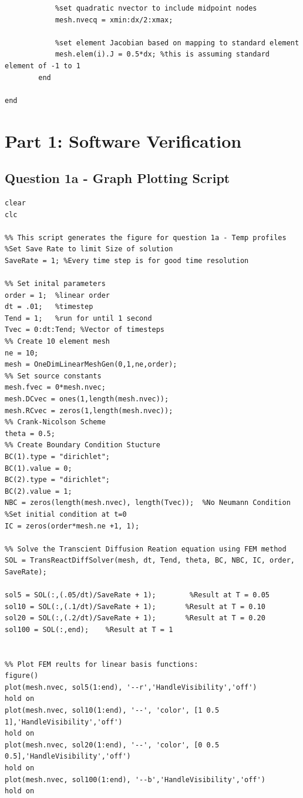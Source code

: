 \documentclass[11pt]{article}
\begin{document}
\begin{appendices}
\begin{lstlisting}
            %set quadratic nvector to include midpoint nodes
            mesh.nvecq = xmin:dx/2:xmax;
            
            %set element Jacobian based on mapping to standard element
            mesh.elem(i).J = 0.5*dx; %this is assuming standard element of -1 to 1 
        end
        
end
\end{lstlisting}


\section{Part 1: Software Verification}
\subsection{Question 1a - Graph Plotting Script}\label{ap:Q1a}

\begin{lstlisting}
clear
clc

%% This script generates the figure for question 1a - Temp profiles
%Set Save Rate to limit Size of solution
SaveRate = 1; %Every time step is for good time resolution

%% Set inital parameters
order = 1;  %linear order
dt = .01;   %timestep
Tend = 1;   %run for until 1 second
Tvec = 0:dt:Tend; %Vector of timesteps
%% Create 10 element mesh
ne = 10;
mesh = OneDimLinearMeshGen(0,1,ne,order);
%% Set source constants
mesh.fvec = 0*mesh.nvec;
mesh.DCvec = ones(1,length(mesh.nvec));
mesh.RCvec = zeros(1,length(mesh.nvec));
%% Crank-Nicolson Scheme
theta = 0.5;
%% Create Boundary Condition Stucture
BC(1).type = "dirichlet";   
BC(1).value = 0;
BC(2).type = "dirichlet";
BC(2).value = 1;
NBC = zeros(length(mesh.nvec), length(Tvec));  %No Neumann Condition
%Set initial condition at t=0
IC = zeros(order*mesh.ne +1, 1);

%% Solve the Transcient Diffusion Reation equation using FEM method
SOL = TransReactDiffSolver(mesh, dt, Tend, theta, BC, NBC, IC, order, SaveRate);

sol5 = SOL(:,(.05/dt)/SaveRate + 1);        %Result at T = 0.05
sol10 = SOL(:,(.1/dt)/SaveRate + 1);       %Result at T = 0.10
sol20 = SOL(:,(.2/dt)/SaveRate + 1);       %Result at T = 0.20
sol100 = SOL(:,end);    %Result at T = 1


%% Plot FEM reults for linear basis functions:
figure()
plot(mesh.nvec, sol5(1:end), '--r','HandleVisibility','off')
hold on
plot(mesh.nvec, sol10(1:end), '--', 'color', [1 0.5 1],'HandleVisibility','off')
hold on
plot(mesh.nvec, sol20(1:end), '--', 'color', [0 0.5 0.5],'HandleVisibility','off')
hold on
plot(mesh.nvec, sol100(1:end), '--b','HandleVisibility','off')
hold on



\end{lstlisting}
\end{appendices}
\end{document}
